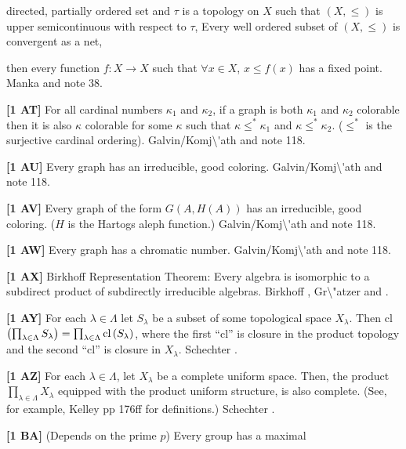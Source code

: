 directed, partially ordered set and $\tau$ is a topology on $X$ such
that
 $(X,\le)$ is upper semicontinuous with respect to $\tau$,
 Every well ordered subset of $(X,\le)$ is convergent as a
net, \par
\item{}then every function $f:X\to X$ such that $\forall x\in X$,
$x\le f(x)$ has a fixed point. \ac{Manka} \cite{1988b} and note 38.
\smallskip
\item{}{\bf [1 AT]} For all cardinal numbers $\kappa_1$ and $\kappa_2$,
if a graph is both $\kappa_1$ and $\kappa_2$ colorable then it is also
$\kappa$ colorable for some $\kappa$ such that $\kappa\le^*\kappa_1$ and
$\kappa\le^*\kappa_2$. ($\le^*$ is the surjective cardinal ordering).
\ac{Galvin/Komj\'ath} \cite{1991} and note 118.
\smallskip
\item{}{\bf [1 AU]} Every graph has an irreducible, good coloring.
\ac{Galvin/Komj\'ath} \cite{1991} and note 118.
\smallskip
\item{}{\bf [1 AV]} Every graph of the form $G(A,H(A))$ has an irreducible,
good coloring.  ($H$ is the Hartogs aleph function.)
\ac{Galvin/Komj\'ath} \cite{1991} and note 118.
\smallskip
\item{}{\bf [1 AW]}  Every graph has a chromatic number.
\ac{Galvin/Komj\'ath} \cite{1991} and note 118.
\smallskip
\item{}{\bf [1 AX]} Birkhoff Representation Theorem: Every algebra is
isomorphic to a subdirect product of subdirectly irreducible algebras.
\ac{Birkhoff} \cite{1944}, \ac{Gr\"atzer} \cite{1979} and \cite{1986}.
\smallskip
\item{}{\bf [1 AY]} For each $\lambda\in\Lambda$ let $S_\lambda$ be a
subset of some topological space $X_\lambda$. Then cl$\left(\prod_
{\lambda\in\Lambda}S_\lambda\right)=\prod_{\lambda\in\Lambda}\hbox{cl}
\left(S_{\lambda}\right)$, where the first ``cl'' is closure in the product
topology and the second ``cl'' is closure in $X_\lambda$. \ac{Schechter}
\cite{1992}.
\smallskip
\item{}{\bf [1 AZ]} For each $\lambda\in\Lambda$, let $X_\lambda$ be a
complete uniform space. Then, the product $\prod_{\lambda\in\Lambda}
X_\lambda$ equipped with the product uniform structure, is also complete.
(See, for example, \ac{Kelley} \cite{1955} pp 176ff for definitions.)
\ac{Schechter} \cite{1992}.
\smallskip
\item{}{\bf [1 BA]} (Depends on the prime $p$) Every group has a maximal
